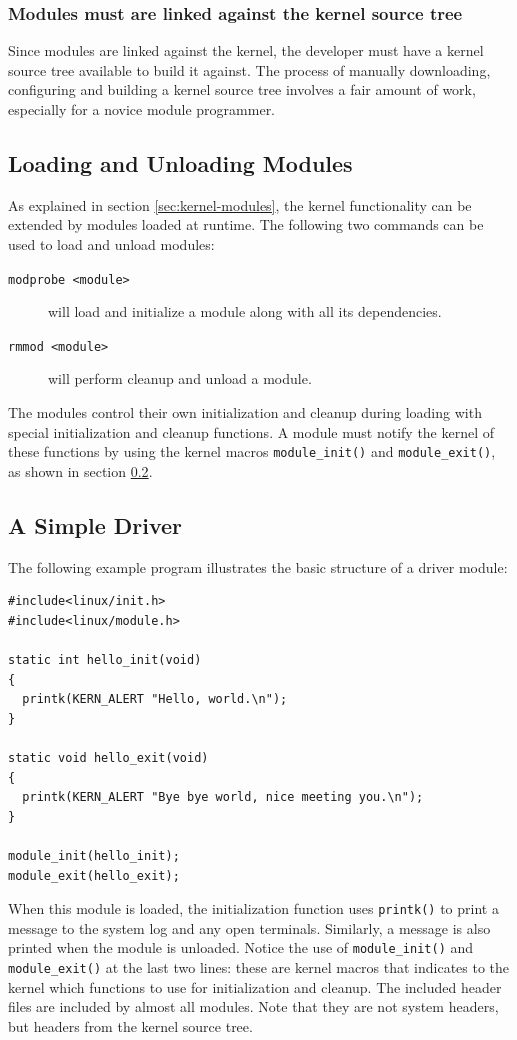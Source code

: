 \subsubsection{Modules must are linked against the kernel source tree}
Since modules are linked against the kernel, the developer must have a kernel source tree available to build it against. The process of manually downloading, configuring and building a kernel source tree involves a fair amount of work, especially for a novice module programmer.


\subsection{Loading and Unloading Modules}
As explained in section \ref{sec:kernel-modules}, the kernel functionality can be extended by modules loaded at runtime. The following two commands can be used to load and unload modules:
\begin{description}
  \item[\texttt{modprobe <module>}] will load and initialize a module along with all its dependencies.
  \item[\texttt{rmmod <module>}] will perform cleanup and unload a module.
\end{description}
The modules control their own initialization and cleanup during loading with special initialization and cleanup functions. A module must notify the kernel of these functions by using the kernel macros \texttt{module\_init()} and \texttt{module\_exit()}, as shown in section \ref{a-simple-driver}.

\subsection{A Simple Driver}\label{a-simple-driver}
The following example program illustrates the basic structure of a driver module:
\lstset{style=lststyle-c}
\begin{lstlisting}
#include<linux/init.h>
#include<linux/module.h>

static int hello_init(void)
{
  printk(KERN_ALERT "Hello, world.\n");
}

static void hello_exit(void)
{
  printk(KERN_ALERT "Bye bye world, nice meeting you.\n");
}

module_init(hello_init);
module_exit(hello_exit);
\end{lstlisting}
When this module is loaded, the initialization function uses \texttt{printk()} to print a message to the system log and any open terminals. Similarly, a message is also printed when the module is unloaded. Notice the use of \texttt{module\_init()} and \texttt{module\_exit()} at the last two lines: these are kernel macros that indicates to the kernel which functions to use for initialization and cleanup. The included header files are included by almost all modules. Note that they are not system headers, but headers from the kernel source tree.

